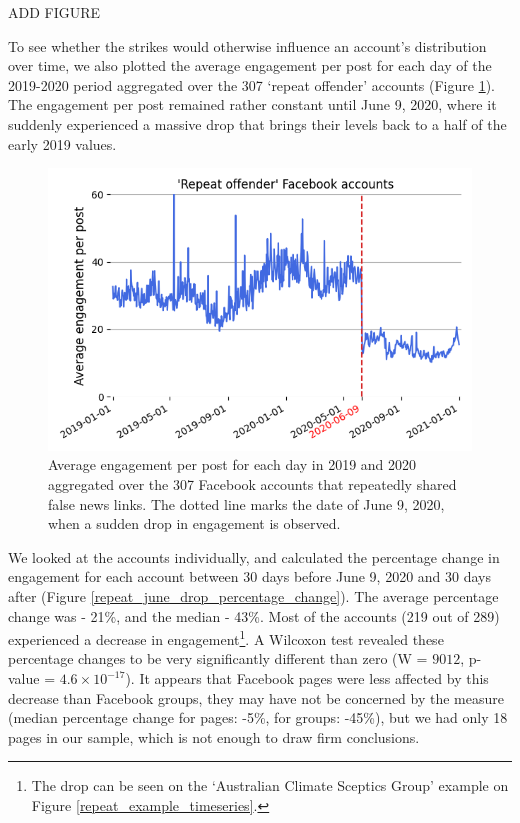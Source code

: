 \documentclass[11pt,a4paper]{article}
\begin{document}
{\color{red}ADD FIGURE}

To see whether the strikes would otherwise influence an account's distribution over time, we also plotted the average engagement per post for each day of the 2019-2020 period aggregated over the 307 `repeat offender' accounts (Figure \ref{repeat_average_timeseries}). 
The engagement per post remained rather constant until June 9, 2020, where it suddenly experienced a massive drop that brings their levels back to a half of the early 2019 values.

\begin{figure}[!h]
\centering
\includegraphics[width=\linewidth]{./../figure/repeat_average_timeseries.png}
\caption{Average engagement per post for each day in 2019 and 2020 aggregated over the 307 Facebook accounts that repeatedly shared false news links. The dotted line marks the date of June 9, 2020, when a sudden drop in engagement is observed.}
\label{repeat_average_timeseries}
\end{figure}

We looked at the accounts individually, and calculated the percentage change in engagement for each account between 30 days before June 9, 2020 and 30 days after (Figure \ref{repeat_june_drop_percentage_change}). 
The average percentage change was - 21\%, and the median - 43\%. Most of the accounts (219 out of 289) experienced a decrease in engagement\footnote{The drop can be seen on the `Australian Climate Sceptics Group' example on Figure \ref{repeat_example_timeseries}.}.
A Wilcoxon test revealed these percentage changes to be very significantly different than zero (W = $9012$, p-value = $4.6 \times 10^{-17}$).
It appears that Facebook pages were less affected by this decrease than Facebook groups, they may have not be concerned by the measure (median percentage change for pages: -5\%, for groups: -45\%), but we had only 18 pages in our sample, which is not enough to draw firm conclusions.
\end{document}
